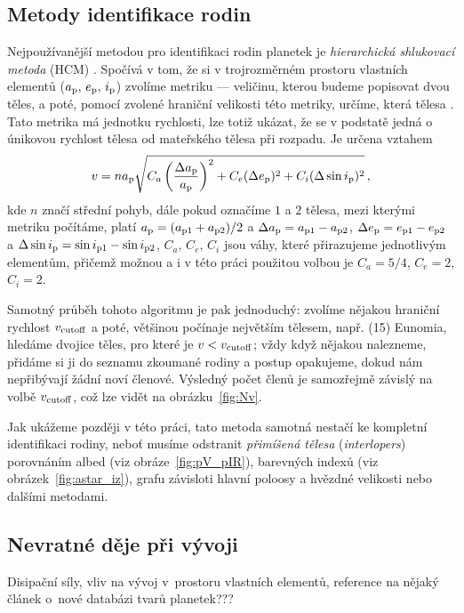 \documentclass[A4paper, 12pt, oneside]{book}%
\newcommand{\I}[1]{\textit{#1}}
\begin{document}
\subsection{Metody identifikace rodin}
Nejpoužívanější metodou pro identifikaci rodin planetek je \I{hierarchická shlukovací metoda} (HCM) \cite{zappala90}. Spočívá v tom, že si v trojrozměrném prostoru vlastních elementů ($a_{\rm p},\,e_{\rm p},\,i_{\rm p}$) zvolíme metriku --- veličinu, kterou budeme popisovat  dvou těles, a poté, pomocí zvolené hraniční velikosti této metriky, určíme, která tělesa . Tato metrika má jednotku rychlosti, lze totiž ukázat, že se v podstatě jedná o únikovou rychlost tělesa od mateřského tělesa při rozpadu. Je určena vztahem
\begin{align}
	v=na_{\rm p}\sqrt{C_a\left(\frac{\Delta a_{\rm p}}{a_{\rm p}}\right)^2+C_e(\Delta e_{\rm p})^2+C_i(\Delta \sin i_{\rm p})^2}\,,
\end{align}
kde $n$ značí střední pohyb, dále pokud označíme $1$ a $2$ tělesa, mezi kterými metriku počítáme, platí $a_{\rm p}=(a_{{\rm p}1}+a_{{\rm p}2})/2$ a $\Delta a_{\rm p}=a_{{\rm p}1}-a_{{\rm p}2}$, $\Delta e_{\rm p}=e_{{\rm p}1}-e_{{\rm p}2}$ a $\Delta \sin i_{\rm p}=\sin i_{{\rm p}1}-\sin i_{{\rm p}2}$, $C_a,\,C_e,\,C_i$ jsou váhy, které přirazujeme jednotlivým elementům, přičemž možnou a i v této práci použitou volbou je $C_a=5/4$, $C_e=2$, $C_i=2$. 

Samotný průběh tohoto algoritmu je pak jednoduchý: zvolíme nějakou hraniční rychlost $v_{\rm cutoff}$ a poté, většinou počínaje největším tělesem, např. (15) Eunomia, hledáme dvojice těles, pro které je $v<v_{\rm cutoff}$; vždy když nějakou nalezneme, přidáme si ji do seznamu zkoumané rodiny a postup opakujeme, dokud nám nepřibývají žádní noví členové. Výsledný počet členů je samozřejmě závislý na volbě $v_{\rm cutoff}$, což lze vidět na obrázku~\ref{fig:Nv}.

Jak ukážeme později v této práci, tato metoda samotná nestačí ke kompletní identifikaci rodiny, neboť musíme odstranit \I{přimíšená tělesa} (\I{interlopers}) porovnáním albed (viz obráze~\ref{fig:pV_pIR}), barevných indexů (viz obrázek~\ref{fig:astar_iz}), grafu závisloti hlavní poloosy a hvězdné velikosti nebo dalšími metodami. 

\subsection{Nevratné děje při vývoji}
Disipační síly, vliv na vývoj v~prostoru vlastních elementů, reference na nějaký článek o~nové databázi tvarů planetek???
\end{document}
